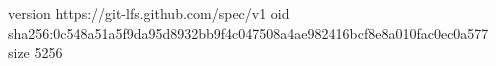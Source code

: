 version https://git-lfs.github.com/spec/v1
oid sha256:0c548a51a5f9da95d8932bb9f4c047508a4ae982416bcf8e8a010fac0ec0a577
size 5256
